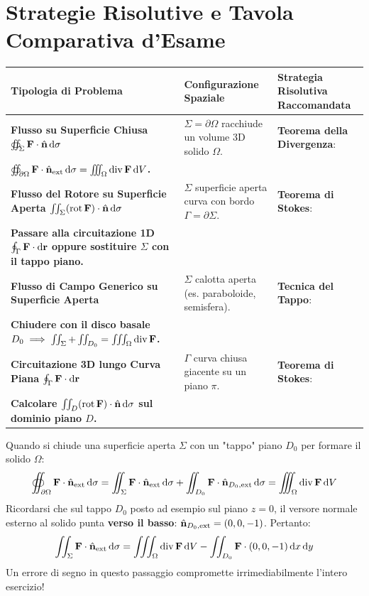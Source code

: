 \section{Strategie Risolutive e Tavola Comparativa d'Esame}

\begin{metodo}
\renewcommand{\arraystretch}{1.35}
\noindent\begin{tabularx}{\linewidth}{>{\raggedright\arraybackslash\bfseries}p{3.2cm} >{\raggedright\arraybackslash}p{3.8cm} >{\raggedright\arraybackslash}X}
\toprule
Tipologia di Problema & Configurazione Spaziale & Strategia Risolutiva Raccomandata \\
\midrule
Flusso su Superficie Chiusa $\oiint_\Sigma \mathbf{F} \cdot \hat{\mathbf{n}} \mathop{}\!\mathrm{d}\sigma$ & $\Sigma = \partial \Omega$ racchiude un volume 3D solido $\Omega$. & \textbf{Teorema della Divergenza}:\\ $\oiint_{\partial \Omega} \mathbf{F} \cdot \hat{\mathbf{n}}_{\text{ext}} \mathop{}\!\mathrm{d}\sigma = \iiint_\Omega \operatorname{div} \mathbf{F} \mathop{}\!\mathrm{d} V$. \\
\midrule
Flusso del Rotore su Superficie Aperta $\iint_\Sigma (\operatorname{rot} \mathbf{F}) \cdot \hat{\mathbf{n}} \mathop{}\!\mathrm{d}\sigma$ & $\Sigma$ superficie aperta curva con bordo $\Gamma = \partial \Sigma$. & \textbf{Teorema di Stokes}:\\ Passare alla circuitazione 1D $\oint_\Gamma \mathbf{F} \cdot \mathop{}\!\mathrm{d}\mathbf{r}$ oppure sostituire $\Sigma$ con il tappo piano. \\
\midrule
Flusso di Campo Generico su Superficie Aperta & $\Sigma$ calotta aperta (es. paraboloide, semisfera). & \textbf{Tecnica del Tappo}:\\ Chiudere con il disco basale $D_0 \implies \iint_\Sigma + \iint_{D_0} = \iiint_\Omega \operatorname{div} \mathbf{F}$. \\
\midrule
Circuitazione 3D lungo Curva Piana $\oint_\Gamma \mathbf{F} \cdot \mathop{}\!\mathrm{d}\mathbf{r}$ & $\Gamma$ curva chiusa giacente su un piano $\pi$. & \textbf{Teorema di Stokes}:\\ Calcolare $\iint_D (\operatorname{rot} \mathbf{F}) \cdot \hat{\mathbf{n}} \mathop{}\!\mathrm{d}\sigma$ sul dominio piano $D$. \\
\bottomrule
\end{tabularx}
\end{metodo}

\begin{esame}
Quando si chiude una superficie aperta $\Sigma$ con un "tappo" piano $D_0$ per formare il solido $\Omega$:
\[
\oiint_{\partial \Omega} \mathbf{F} \cdot \hat{\mathbf{n}}_{\text{ext}} \mathop{}\!\mathrm{d}\sigma = \iint_\Sigma \mathbf{F} \cdot \hat{\mathbf{n}}_{\text{ext}} \mathop{}\!\mathrm{d}\sigma + \iint_{D_0} \mathbf{F} \cdot \hat{\mathbf{n}}_{D_0, \text{ext}} \mathop{}\!\mathrm{d}\sigma = \iiint_\Omega \operatorname{div} \mathbf{F} \mathop{}\!\mathrm{d} V
\]
Ricordarsi che sul tappo $D_0$ posto ad esempio sul piano $z = 0$, il versore normale esterno al solido punta \textbf{verso il basso}: $\hat{\mathbf{n}}_{D_0, \text{ext}} = (0, 0, -1)$.
Pertanto:
\[
\iint_\Sigma \mathbf{F} \cdot \hat{\mathbf{n}}_{\text{ext}} \mathop{}\!\mathrm{d}\sigma = \iiint_\Omega \operatorname{div} \mathbf{F} \mathop{}\!\mathrm{d} V - \iint_{D_0} \mathbf{F} \cdot (0, 0, -1) \mathop{}\!\mathrm{d} x\mathop{}\!\mathrm{d} y
\]
Un errore di segno in questo passaggio compromette irrimediabilmente l'intero esercizio!
\end{esame}
